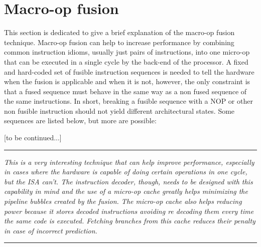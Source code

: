 \section[Macro-op fusion]{Macro-op fusion}

    \vspace{10pt}

    This section is dedicated to give a brief explanation of the macro-op fusion technique. Macro-op fusion can help to increase performance by combining common instruction idioms, usually just pairs of instructions, into one micro-op that can be executed in a single cycle by the back-end of the processor. A fixed and hard-coded set of fusible instruction sequences is needed to tell the hardware when the fusion is applicable and when it is not, however, the only constraint is that a fused sequence must behave in the same way as a non fused sequence of the same instructions. In short, breaking a fusible sequence with a NOP or other non fusible instruction should not yield different architectural states. Some sequences are listed below, but more are possible:

    [to be continued...]

    \par\noindent\rule{\textwidth}{0.4pt}
    \textit{This is a very interesting technique that can help improve performance, especially in cases where the hardware is capable of doing certain operations in one cycle, but the ISA can't. The instruction decoder, though, needs to be designed with this capability in mind and the use of a micro-op cache greatly helps minimizing the pipeline bubbles created by the fusion. The micro-op cache also helps reducing power because it stores decoded instructions avoiding re decoding them every time the same code is executed. Fetching branches from this cache reduces their penalty in case of incorrect prediction.}
    \par\noindent\rule{\textwidth}{0.4pt}